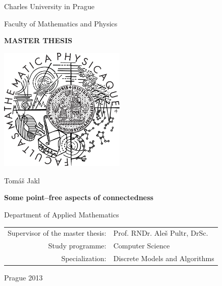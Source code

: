 
\pagestyle{empty}
\begin{center}

{\large Charles University in Prague}

\medskip
{\large Faculty of Mathematics and Physics}

\vfill
{\bfseries\Large MASTER THESIS}

\vfill
\centerline{\mbox{\includegraphics[width=60mm]{mfflogo.pdf}}}

\vfill
\vspace{5mm}

{\LARGE Tom\'a\v s Jakl}

\vspace{15mm}

{\LARGE\bfseries Some point--free aspects of connectedness}

\vfill

Department of Applied Mathematics

\vfill

\begin{tabular}{rl}
Supervisor of the master thesis: & Prof. RNDr. Aleš Pultr, DrSc. \\   
\noalign{\vspace{2mm}}
Study programme: & Computer Science\\
\noalign{\vspace{2mm}}
Specialization: & Discrete Models and Algorithms\\
\end{tabular}

\vfill

Prague 2013

\end{center}



